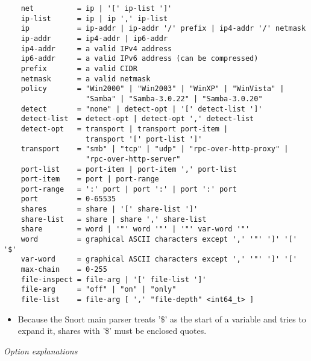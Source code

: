\documentclass[english]{report}
\begin{document}
\footnotesize
\begin{verbatim}
    net          = ip | '[' ip-list ']'
    ip-list      = ip | ip ',' ip-list
    ip           = ip-addr | ip-addr '/' prefix | ip4-addr '/' netmask
    ip-addr      = ip4-addr | ip6-addr
    ip4-addr     = a valid IPv4 address
    ip6-addr     = a valid IPv6 address (can be compressed)
    prefix       = a valid CIDR
    netmask      = a valid netmask
    policy       = "Win2000" | "Win2003" | "WinXP" | "WinVista" |
                   "Samba" | "Samba-3.0.22" | "Samba-3.0.20"
    detect       = "none" | detect-opt | '[' detect-list ']'
    detect-list  = detect-opt | detect-opt ',' detect-list
    detect-opt   = transport | transport port-item | 
                   transport '[' port-list ']'
    transport    = "smb" | "tcp" | "udp" | "rpc-over-http-proxy" | 
                   "rpc-over-http-server"
    port-list    = port-item | port-item ',' port-list
    port-item    = port | port-range
    port-range   = ':' port | port ':' | port ':' port
    port         = 0-65535
    shares       = share | '[' share-list ']'
    share-list   = share | share ',' share-list
    share        = word | '"' word '"' | '"' var-word '"'
    word         = graphical ASCII characters except ',' '"' ']' '[' '$'
    var-word     = graphical ASCII characters except ',' '"' ']' '['
    max-chain    = 0-255
    file-inspect = file-arg | '[' file-list ']'
    file-arg     = "off" | "on" | "only"
    file-list    = file-arg [ ',' "file-depth" <int64_t> ]
\end{verbatim}
\normalsize

\begin{itemize}

\item[] Because the Snort main parser treats '\$' as the start of a variable
and tries to expand it, shares with '\$' must be enclosed quotes.

\end{itemize}

\textit{Option explanations}
\end{document}
